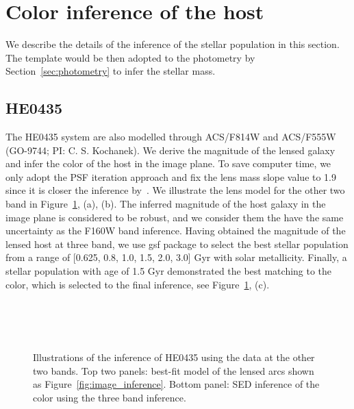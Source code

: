 \documentclass[fleqn,usenatbib]{mnras}
\begin{document}

\appendix

\section{Color inference of the host}
We describe the details of the inference of the stellar population in this section. The template would be then adopted to the photometry by Section~\ref{sec:photometry} to infer the stellar mass.
\subsection{HE0435}\label{app:HE0435}
The HE0435 system are also modelled through ACS/F814W and ACS/F555W (GO-9744; PI: C. S. Kochanek). We derive the magnitude of the lensed galaxy and infer the color of the host in the image plane. To save computer time, we only adopt the PSF iteration approach and fix the lens mass slope value to 1.9 since it is closer the inference by~\citet[][i.e., $\gamma\sim1.93$]{Wong2017}. We illustrate the lens model for the other two band in Figure~\ref{fig:app_HE0435}, (a), (b). The inferred magnitude of the host galaxy in the image plane is considered to be robust, and we consider them the have the same uncertainty as the F160W band inference. Having obtained the magnitude of the lensed host at three band, we use {\sc gsf} package to select the best stellar population from a range of [0.625, 0.8, 1.0, 1.5, 2.0, 3.0] Gyr with solar metallicity. Finally, a stellar population with age of 1.5 Gyr demonstrated the best matching to the color, which is selected to the final inference, see Figure~\ref{fig:app_HE0435}, (c).


\begin{figure}
\centering
{}\\
\\
\\
\caption{\label{fig:app_HE0435} 
Illustrations of the inference of HE0435 using the data at the other two bands. Top two panels: best-fit model of the lensed arcs shown as Figure~\ref{fig:image_inference}. Bottom panel: SED inference of the color using the three band inference.}
\end{figure} 
\end{document}
